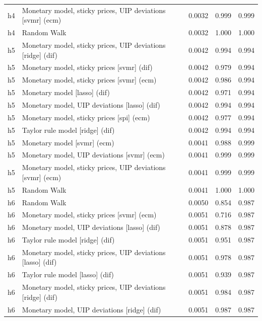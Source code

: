 \begin{ThreePartTable}
\begin{longtable}[t]{cp{5.5cm}ccc}
h4 & \raggedright Monetary model, sticky prices, UIP deviations [svmr] (ecm) & 0.0032 & 0.999 & 0.999\\
h4 & \raggedright Random Walk & 0.0032 & 1.000 & 1.000\\
\addlinespace
h5 & \raggedright Monetary model, sticky prices, UIP deviations [ridge] (dif) & 0.0042 & 0.994 & 0.994\\
h5 & \raggedright Monetary model, sticky prices [svmr] (dif) & 0.0042 & 0.979 & 0.994\\
h5 & \raggedright Monetary model, sticky prices [svmr] (ecm) & 0.0042 & 0.986 & 0.994\\
h5 & \raggedright Monetary model [lasso] (dif) & 0.0042 & 0.971 & 0.994\\
h5 & \raggedright Monetary model, UIP deviations [lasso] (dif) & 0.0042 & 0.994 & 0.994\\
h5 & \raggedright Monetary model, sticky prices [spi] (ecm) & 0.0042 & 0.977 & 0.994\\
h5 & \raggedright Taylor rule model [ridge] (dif) & 0.0042 & 0.994 & 0.994\\
h5 & \raggedright Monetary model [svmr] (ecm) & 0.0041 & 0.988 & 0.999\\
h5 & \raggedright Monetary model, UIP deviations [svmr] (ecm) & 0.0041 & 0.999 & 0.999\\
h5 & \raggedright Monetary model, sticky prices, UIP deviations [svmr] (ecm) & 0.0041 & 0.999 & 0.999\\
h5 & \raggedright Random Walk & 0.0041 & 1.000 & 1.000\\
\addlinespace
h6 & \raggedright Random Walk & 0.0050 & 0.854 & 0.987\\
h6 & \raggedright Monetary model, sticky prices [svmr] (ecm) & 0.0051 & 0.716 & 0.987\\
h6 & \raggedright Monetary model, UIP deviations [lasso] (dif) & 0.0051 & 0.878 & 0.987\\
h6 & \raggedright Taylor rule model [ridge] (dif) & 0.0051 & 0.951 & 0.987\\
h6 & \raggedright Monetary model, sticky prices, UIP deviations [lasso] (dif) & 0.0051 & 0.978 & 0.987\\
h6 & \raggedright Taylor rule model [lasso] (dif) & 0.0051 & 0.939 & 0.987\\
h6 & \raggedright Monetary model, sticky prices, UIP deviations [ridge] (dif) & 0.0051 & 0.984 & 0.987\\
h6 & \raggedright Monetary model, UIP deviations [ridge] (dif) & 0.0051 & 0.987 & 0.987\\

\end{longtable}
\end{ThreePartTable}
